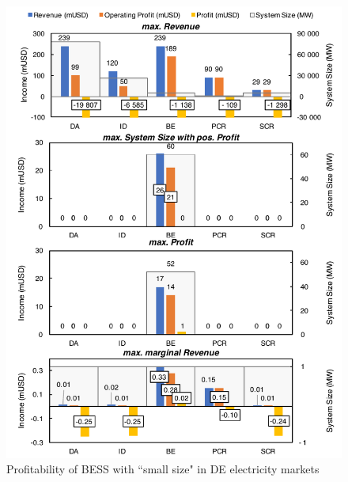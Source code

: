 \begin{figure}[h!]
	\centering
	\includegraphics[width=0.9\linewidth]{Figures/Germany_ESS}
	\caption{Profitability of  BESS with ``small size" in DE electricity markets}
	\label{fig:germany-ess-profitability}
\end{figure}



